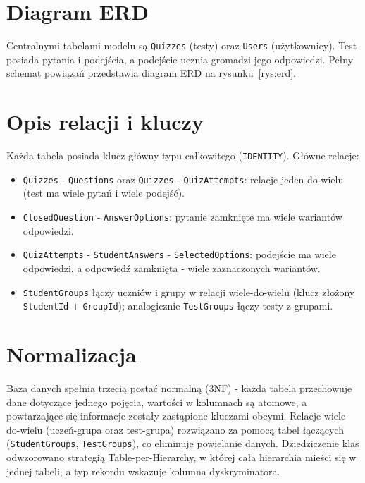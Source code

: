 \section{Diagram ERD}
\label{sec:erd}

Centralnymi tabelami modelu są \texttt{Quizzes} (testy) oraz \texttt{Users} (użytkownicy). Test
posiada pytania i podejścia, a podejście ucznia gromadzi jego odpowiedzi. Pełny schemat powiązań
przedstawia diagram ERD na rysunku~\ref{rys:erd}.


\section{Opis relacji i kluczy}
\label{sec:relacje}

Każda tabela posiada klucz główny typu całkowitego (\texttt{IDENTITY}). Główne relacje:

\begin{itemize}
  \item \texttt{Quizzes} - \texttt{Questions} oraz \texttt{Quizzes} - \texttt{QuizAttempts}: relacje
        jeden-do-wielu (test ma wiele pytań i wiele podejść).
  \item \texttt{ClosedQuestion} - \texttt{AnswerOptions}: pytanie zamknięte ma wiele wariantów
        odpowiedzi.
  \item \texttt{QuizAttempts} - \texttt{StudentAnswers} - \texttt{SelectedOptions}: podejście ma wiele
        odpowiedzi, a odpowiedź zamknięta - wiele zaznaczonych wariantów.
  \item \texttt{StudentGroups} łączy uczniów i grupy w relacji wiele-do-wielu (klucz złożony
        \texttt{StudentId} + \texttt{GroupId}); analogicznie \texttt{TestGroups} łączy testy z grupami.
\end{itemize}

\section{Normalizacja}
\label{sec:normalizacja}

Baza danych spełnia trzecią postać normalną (3NF) - każda tabela przechowuje dane dotyczące jednego
pojęcia, wartości w kolumnach są atomowe, a powtarzające się informacje zostały zastąpione kluczami
obcymi. Relacje wiele-do-wielu (uczeń-grupa oraz test-grupa) rozwiązano za pomocą tabel łączących
(\texttt{StudentGroups}, \texttt{TestGroups}), co eliminuje powielanie danych. Dziedziczenie klas
odwzorowano strategią Table-per-Hierarchy, w której cała hierarchia mieści się w jednej tabeli,
a typ rekordu wskazuje kolumna dyskryminatora.

